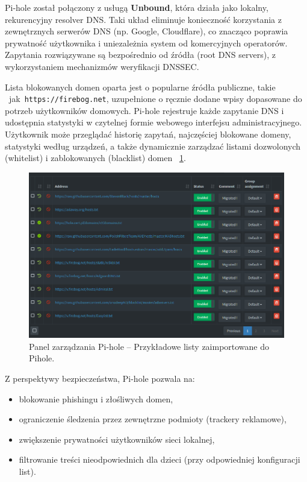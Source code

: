 \documentclass[
    left=2.5cm,         %
    right=2.5cm,        %
    top=2.5cm,          %
    bottom=3cm,         %
    bindingoffset=6mm,  %
    nohyphenation=true %
]{eiti/eiti-thesis} %
\begin{document}
Pi-hole został połączony z usługą \textbf{Unbound}, która działa jako lokalny, rekurencyjny resolver DNS. Taki układ eliminuje konieczność korzystania z zewnętrznych serwerów DNS\cite{dns-wikipedia} (np. Google, Cloudflare), co znacząco poprawia prywatność użytkownika i uniezależnia system od komercyjnych operatorów. Zapytania rozwiązywane są bezpośrednio od źródła (root DNS servers), z wykorzystaniem mechanizmów weryfikacji DNSSEC.

Lista blokowanych domen oparta jest o popularne źródła publiczne, takie ~jak~\texttt{https://firebog.net}, uzupełnione o ręcznie dodane wpisy dopasowane do potrzeb użytkowników domowych. Pi-hole rejestruje każde zapytanie DNS i udostępnia statystyki w czytelnej formie webowego interfejsu administracyjnego. Użytkownik może przeglądać historię zapytań, najczęściej blokowane domeny, statystyki według urządzeń, a także dynamicznie zarządzać listami dozwolonych (whitelist) i zablokowanych (blacklist) domen ~\ref{fig:pihole-listy}.
\begin{figure}[H]
    \centering
    \includegraphics[width=\textwidth]{img/pihole_listy.png}
    \caption{Panel zarządzania Pi-hole – Przykładowe listy zaimportowane do Pihole.}
    \label{fig:pihole-listy}
\end{figure}

Z perspektywy bezpieczeństwa, Pi-hole pozwala na:
\begin{itemize}
    \item blokowanie phishingu i złośliwych domen,
    \item ograniczenie śledzenia przez zewnętrzne podmioty (trackery reklamowe),
    \item zwiększenie prywatności użytkowników sieci lokalnej,
    \item filtrowanie treści nieodpowiednich dla dzieci (przy odpowiedniej konfiguracji list).
\end{itemize}
\end{document}
